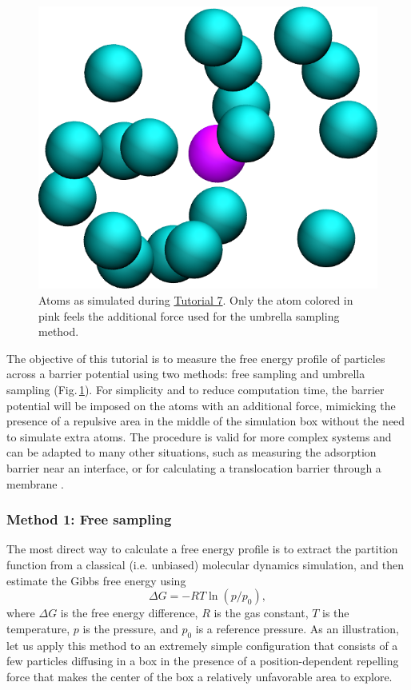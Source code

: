 \documentclass[9pt,tutorial]{livecoms}
\begin{document}
\begin{figure}
\centering
\includegraphics[width=0.55\linewidth]{US}
\caption{Atoms as simulated during \hyperref[umbrella-sampling-label]{Tutorial 7}.
Only the atom colored in pink feels the additional force used for the umbrella
sampling method.}
\label{fig:US}
\end{figure}

\noindent The objective of this tutorial is to measure the free energy profile
of particles across a barrier potential using two methods: free sampling and
umbrella sampling \cite{kastner2011umbrella, allen2017computer, frenkel2023understanding} (Fig.\,\ref{fig:US}).
For simplicity and to reduce computation time, the barrier potential will be
imposed on the atoms with an additional force, mimicking the presence of a repulsive
area in the middle of the simulation box without the need to simulate extra atoms.
The procedure is valid for more complex systems and can be adapted to many other
situations, such as measuring the adsorption barrier near an interface, or for
calculating a translocation barrier through a membrane
\cite{wilson1997adsorption, makarov2009computer, gravelle2021adsorption}.

\subsubsection{Method 1: Free sampling}
The most direct way to calculate a free energy profile is to extract the partition
function from a classical (i.e. unbiased) molecular dynamics simulation, and
then estimate the Gibbs free energy using
\begin{equation}
\Delta G = -RT \ln(p/p_0),
\label{eq:G}
\end{equation}
where $\Delta G$ is the free energy difference, $R$ is the gas constant, $T$
is the temperature, $p$ is the pressure, and $p_0$ is a reference pressure.
As an illustration, let us apply this method to an extremely simple configuration
that consists of a few particles diffusing in a box in the presence of a
position-dependent repelling force that makes the center of the box a relatively
unfavorable area to explore.
\end{document}

